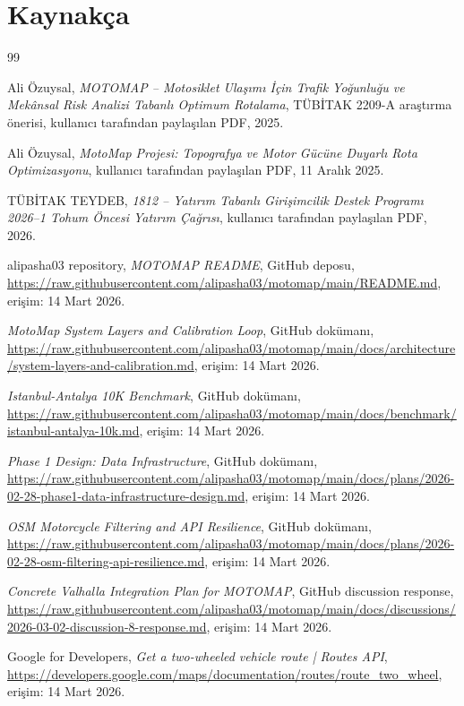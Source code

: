 \documentclass[11pt,a4paper]{article}
\begin{document}
\newpage
\section*{Kaynakça}
\begin{thebibliography}{99}
\small

Ali Özuysal, \emph{MOTOMAP -- Motosiklet Ulaşımı İçin Trafik Yoğunluğu ve Mekânsal Risk Analizi Tabanlı Optimum Rotalama}, TÜBİTAK 2209-A araştırma önerisi, kullanıcı tarafından paylaşılan PDF, 2025.

Ali Özuysal, \emph{MotoMap Projesi: Topografya ve Motor Gücüne Duyarlı Rota Optimizasyonu}, kullanıcı tarafından paylaşılan PDF, 11 Aralık 2025.

TÜBİTAK TEYDEB, \emph{1812 -- Yatırım Tabanlı Girişimcilik Destek Programı 2026--1 Tohum Öncesi Yatırım Çağrısı}, kullanıcı tarafından paylaşılan PDF, 2026.

alipasha03 repository, \emph{MOTOMAP README}, GitHub deposu, \url{https://raw.githubusercontent.com/alipasha03/motomap/main/README.md}, erişim: 14 Mart 2026.

\emph{MotoMap System Layers and Calibration Loop}, GitHub dokümanı, \url{https://raw.githubusercontent.com/alipasha03/motomap/main/docs/architecture/system-layers-and-calibration.md}, erişim: 14 Mart 2026.

\emph{Istanbul-Antalya 10K Benchmark}, GitHub dokümanı, \url{https://raw.githubusercontent.com/alipasha03/motomap/main/docs/benchmark/istanbul-antalya-10k.md}, erişim: 14 Mart 2026.

\emph{Phase 1 Design: Data Infrastructure}, GitHub dokümanı, \url{https://raw.githubusercontent.com/alipasha03/motomap/main/docs/plans/2026-02-28-phase1-data-infrastructure-design.md}, erişim: 14 Mart 2026.

\emph{OSM Motorcycle Filtering and API Resilience}, GitHub dokümanı, \url{https://raw.githubusercontent.com/alipasha03/motomap/main/docs/plans/2026-02-28-osm-filtering-api-resilience.md}, erişim: 14 Mart 2026.

\emph{Concrete Valhalla Integration Plan for MOTOMAP}, GitHub discussion response, \url{https://raw.githubusercontent.com/alipasha03/motomap/main/docs/discussions/2026-03-02-discussion-8-response.md}, erişim: 14 Mart 2026.

Google for Developers, \emph{Get a two-wheeled vehicle route | Routes API}, \url{https://developers.google.com/maps/documentation/routes/route_two_wheel}, erişim: 14 Mart 2026.


\end{thebibliography}
\end{document}

